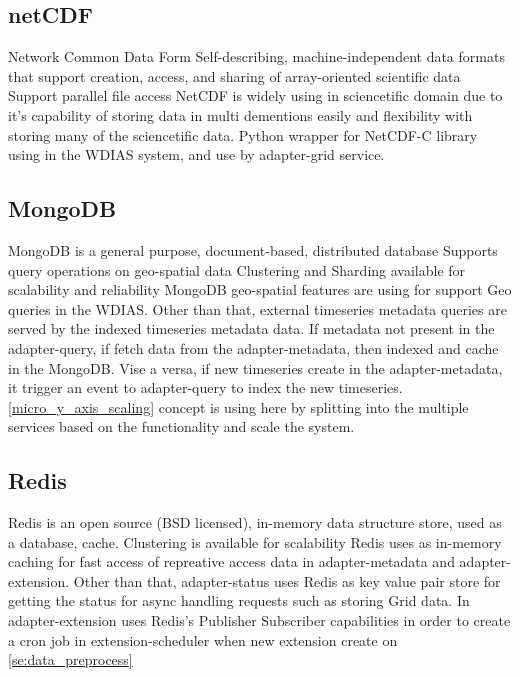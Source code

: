 \subsection{netCDF} \cite{unidataUnidataNetCDF}
\label{sub:netcdf}
Network Common Data Form
Self-describing, machine-independent data formats that support creation, access, and sharing of array-oriented scientific data
Support parallel file access
NetCDF is widely using in sciencetific domain due to it's capability of storing data in multi dementions easily and flexibility with storing many of the sciencetific data.
Python wrapper for NetCDF-C library using in the WDIAS system, and use by adapter-grid service.

\subsection{MongoDB}
\label{sub:mongodb}
  MongoDB is a general purpose, document-based, distributed database
  Supports query operations on geo-spatial data \cite{mongodbMongoDBManual}
  Clustering and Sharding available for scalability and reliability
MongoDB geo-spatial features are using for support Geo queries in the WDIAS. Other than that, external timeseries metadata queries are served by the indexed timeseries metadata data.
If metadata not present in the adapter-query, if fetch data from the adapter-metadata, then indexed and cache in the MongoDB. Vise a versa, if new timeseries create in the adapter-metadata,
it trigger an event to adapter-query to index the new timeseries.
\ref{micro_y_axis_scaling} concept is using here by splitting into the multiple services based on the functionality and scale the system.

\subsection{Redis}
\label{sub:redis}
  Redis\cite{redisRedisDocumentation} is an open source (BSD licensed), in-memory data structure store, used as a database, cache.
  Clustering is available for scalability
Redis uses as in-memory caching for fast access of repreative access data in adapter-metadata and adapter-extension.
Other than that, adapter-status uses Redis as key value pair store for getting the status for async handling requests such as storing Grid data.
In adapter-extension uses Redis's Publisher Subscriber capabilities in order to create a cron job in extension-scheduler when new extension create on \ref{se:data_preprocess}
